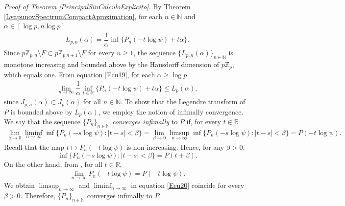 \documentclass[11pt]{amsart}
\theoremstyle{remark}
\numberwithin{equation}{section}
\newcommand{\N}{\mathbb{N}}
\newcommand{\R}{\mathbb{R}}
\newcommand{\Z}{\mathbb{Z}}
\begin{document}
\textit{Proof of Theorem \ref{PrincipalSinCalculoExplicito}.}
By Theorem \ref{LyapunovSpectrumCompactAproximation}, for each $n\in \N$ and $\alpha \in [\log p,n\log p]$ 
    \begin{align}\label{Ecu19}
        L_{p,n}(\alpha)=\dfrac{1}{\alpha}\inf\{P_{n}(-t\log \psi)+t\alpha\}.
    \end{align} Since $ p\Z_{p,n}\setminus F\subset  p\Z_{p_,n+1}\setminus F$ for every $n\geq 1$, the sequence $\{L_{p,n}(\alpha)\}_{n\in \N}$ is monotone increasing and bounded above by the Hausdorff dimension of $p\Z_p$, which equals one. From equation \eqref{Ecu19}, for each $\alpha\geq \log p$
    \begin{align}\label{Ecu20}
        \lim_{n\to \infty}\dfrac{1}{\alpha}\inf_{t\in \R}\{P_{n}(-t\log \psi)+t\alpha\}\leq L_p(\alpha),
    \end{align}since $J_{p,n}(\alpha)\subset J_{p}(\alpha)$ for all $n\in \N$. To show that the Legendre transform of $P$ is bounded above by $L_p(\alpha)$, we employ the notion of infimally convergence. We say that the sequence $\{P_{n}\}_{n\in \N}$ \textit{converges infimally} to $P$ if, for every $t\in \R$ \begin{align}\label{InfimalCon} 
    \lim_{\beta\rightarrow 0}\liminf_{n\rightarrow \infty}\inf\{P_{n}
(-s\log \psi):|t-s|<\beta\}=\lim_{\beta\rightarrow 0}\limsup_{n\rightarrow \infty}\inf\{P_{n}
(-s\log\psi):|t-s|<\beta\}=P(-t\log\psi).
\end{align} Recall that the map $t\mapsto P_{n}(-t\log \psi)$ is non-increasing. Hence, for any $\beta>0$, $$\inf\{P_{n}(-s\log \psi):|t-s|<\beta\}=P(t+\beta).$$ On the other hand, from \cite[Theorem 2]{sa2}, for all $t\in \R$, 
\begin{align}\label{SarigConvergence}
    \lim_{n\rightarrow \infty}P_{n}(-t\log \psi)=P(-t\log \psi).
\end{align} We obtain $\limsup_{n\rightarrow \infty}$ and $\liminf_{n\rightarrow \infty}$ in equation \eqref{Ecu20} coincide for every $\beta>0$. Therefore, $\{P_{n}\}_{n\in \N}$ converges infimally to $P$.
\end{document}
